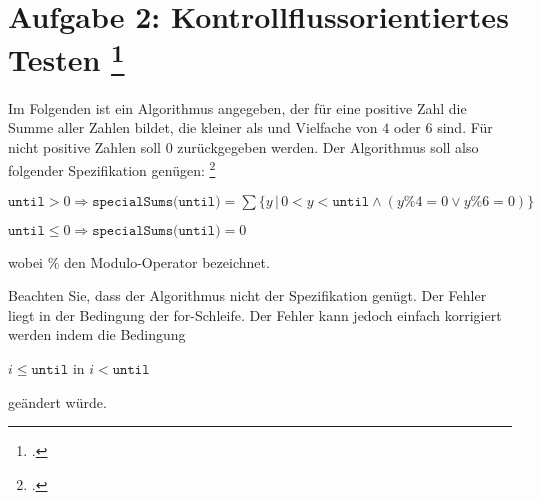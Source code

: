 \documentclass{lehramt-informatik-aufgabe}
\begin{document}
\let\c=\liKontrollCode
\let\b=\liBedingung


\section{Aufgabe 2: Kontrollflussorientiertes Testen
\footcite[Thema 2 Teilaufgabe 2 Aufgabe 3]{examen:66116:2014:09}
}

Im Folgenden ist ein Algorithmus angegeben, der für eine positive Zahl
 die Summe aller Zahlen bildet, die kleiner als
 und Vielfache von $4$ oder $6$ sind. Für nicht
positive Zahlen soll $0$ zurückgegeben werden. Der Algorithmus soll also
folgender Spezifikation genügen:
\footcite[Aufgabe 2: Kontrollflussorientiertes Testen]{sosy:ab:7}

\bigskip

{\footnotesize
\noindent
$\texttt{until} > 0 \Rightarrow \texttt{specialSums(until)} =
\sum \{y \, | \, 0 < y < \texttt{until} \land (y\%4 = 0 \lor y\%6 = 0)\}$

\noindent
$\texttt{until} \leq 0 \Rightarrow \texttt{specialSums(until)} = 0$
}

\bigskip\noindent
wobei $\%$ den Modulo-Operator bezeichnet.


\noindent
Beachten Sie, dass der Algorithmus nicht der Spezifikation genügt. Der
Fehler liegt in der Bedingung der for-Schleife. Der Fehler kann jedoch
einfach korrigiert werden indem die Bedingung

\begin{center}
$i \leq \texttt{until}$ in $i < \texttt{until}$
\end{center}

geändert würde.
\end{document}
